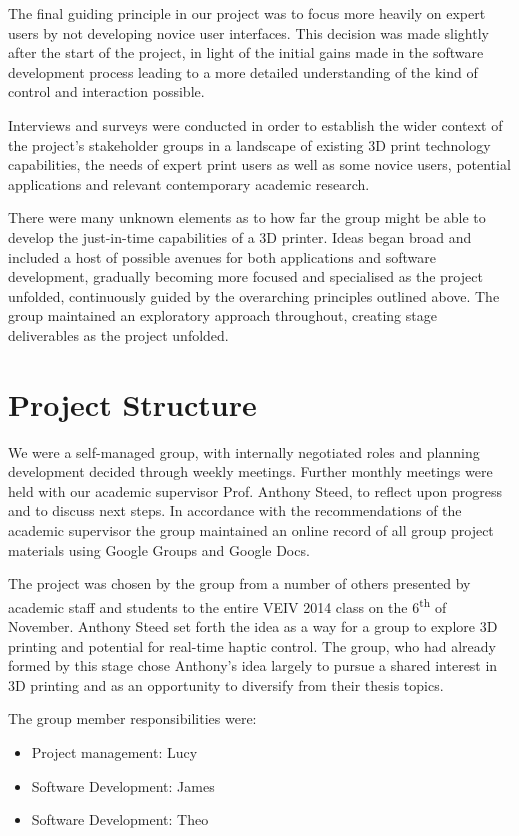 \documentclass[11pt]{report} %
\begin{document}
The final guiding principle in our project was to focus more heavily on expert users by not developing novice user interfaces. This decision was made slightly after the start of the project, in light of the initial gains made in the software development process leading to a more detailed understanding of the kind of control and interaction possible. 

Interviews and surveys were conducted in order to establish the wider context of the project's stakeholder groups in a landscape of existing 3D print technology capabilities, the needs of expert print users as well as some novice users, potential applications and relevant contemporary academic research.  

There were many unknown elements as to how far the group might be able to develop the just-in-time capabilities of a 3D printer. Ideas began broad and included a host of possible avenues for both applications and software development, gradually becoming more focused and specialised as the project unfolded, continuously guided by the overarching principles outlined above. The group maintained an exploratory approach throughout, creating stage deliverables as the project unfolded. 




\section{Project Structure}
We were a self-managed group, with internally negotiated roles and planning development decided through weekly meetings. Further monthly meetings were held with our academic supervisor Prof. Anthony Steed, to reflect upon progress and to discuss next steps.  In accordance with the recommendations of the academic supervisor the group maintained an online record of all group project materials using Google Groups and Google Docs. 

The project was chosen by the group from a number of others presented by academic staff and students to the entire VEIV 2014 class on the 6\textsuperscript{th} of November. Anthony Steed set forth the idea as a way for a group to explore 3D printing and potential for real-time haptic control. The group, who had already formed by this stage chose Anthony's idea largely to pursue a shared interest in 3D printing and as an opportunity to diversify from their thesis topics. 

The group member responsibilities were:
\begin{itemize}
\item Project management: Lucy
\item Software Development: James
\item Software Development: Theo
\end{itemize}
\end{document}
